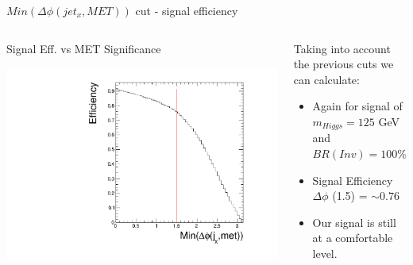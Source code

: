 \documentclass[8pt]{beamer}
\begin{document}
\begin{frame}{$Min(\Delta\phi(jet_{x},MET))$ cut - signal efficiency}
 
\begin{columns}
 
\begin{block}{Signal Eff. vs MET Significance}

\includegraphics[width=\linewidth]{img/DEta3p6_MetSig3p0/DEta3p6_MetSig3p0_jetmet_mindphiEff.pdf} 

\end{block}

\begin{block}{}

Taking into account the previous cuts we can calculate:
\begin{itemize}
  \item Again for signal of $m_{Higgs}=125$ GeV and $BR(Inv)=100\%$ 
  \item Signal Efficiency $\Delta\phi$ (1.5) = $\sim0.76$
  \item Our signal is still at a comfortable level. 
\end{itemize}

\end{block}

\end{columns}

\end{frame}
\end{document}

